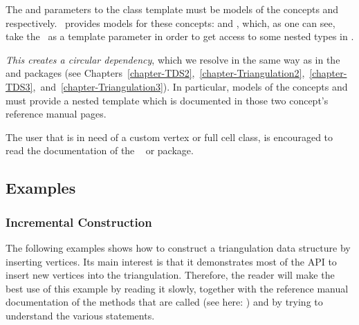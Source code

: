 The  and  parameters to the class template
must be models of the concepts  and
 respectively. \cgal\ provides models for these
concepts:  and
, which, as one
can see, take the \tds\ as a template parameter in order to get access to
some nested types in \tds.

{\em This creates a circular dependency}, which we resolve in the same way
as in the \cgal\  and  packages (see
Chapters~\ref{chapter-TDS2},~\ref{chapter-Triangulation2},~\ref{chapter-TDS3},~and~\ref{chapter-Triangulation3}).
In particular, models of the concepts  and
 must provide a nested template 
which is documented in those two concept's reference manual pages.

\begin{ccAdvanced}
The user that is in need of a custom vertex or full cell class, is
encouraged to read the documentation of the \cgal\
  or   package. 
\end{ccAdvanced}


\subsection{Examples\label{triangulation:tds:examples}}

\subsubsection{Incremental Construction}
The following examples shows how to construct a triangulation data structure by
inserting vertices. Its main interest is that it demonstrates most of the API
to insert new vertices into the triangulation. Therefore, the reader will make
the best use of this example by reading it slowly, together with the reference
manual documentation of the methods that are called (see here:
) and by trying to understand the various 
\ccc{assert(...)} statements.


